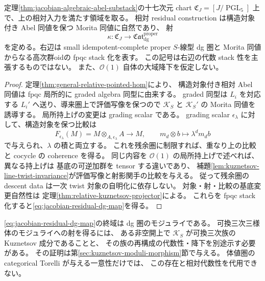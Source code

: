 \begin{theorem}
\label{thm:jacobian-residual-dg-map}
定理\ref{thm:jacobian-algebraic-abel-substack}の十七次元 chart
$\mathfrak C_J=[J/\operatorname{PGL}_5]$ 上で、上の相対入力を満たす領域を取る。
相対 residual construction は構造対象付き Abel 同値を保つ Morita 同値に自然であり、
射
\begin{equation}\label{eq:jacobian-residual-dg-map}
 \kappa:\mathfrak C_J\longrightarrow\mathfrak{Cat}^{\mathrm{proper}}_{\mathrm{dg}}
\end{equation}
を定める。右辺は small idempotent-complete proper $S$-線型 dg 圏と
Morita 同値からなる高次群oidの fpqc stack 化を表す。
この記号は右辺の代数 stack 性を主張するものではない。
また、$\mathcal O(1)$ 自体の大域降下を仮定しない。
\end{theorem}
\begin{proof}
定理\ref{thm:general-relative-pointed-hom}により、
構造対象付き相対 Abel 同値は fpqc 局所的に graded algebra 同型に由来する。
graded 同型は $L_i$ を対応する $L_i'$ へ送り、導来圏上で評価写像を保つので
$\mathcal K_S$ と $\mathcal K_S'$ の Morita 同値を誘導する。
局所持上げの変更は grading scalar である。
grading scalar $\epsilon_\lambda$ に対して、構造対象を保つ比較は
\[
 F_{\epsilon_\lambda}(M)
       =M\otimes_{A,\epsilon_\lambda}A\longrightarrow M,
 \qquad m_d\otimes b\longmapsto\lambda^d m_db
\]
で与えられ、$\lambda$ の積と両立する。
これを残余圏に制限すれば、重なり上の比較と cocycle の coherence を得る。
同じ内容を $\mathcal O(1)$ の局所持上げで述べれば、異なる持上げは
基底の可逆加群を tensor する違いであり、
補題\ref{lem:kuznetsov-line-twist-invariance}が評価写像と射影関手の比較を与える。
従って残余圏の descent data は一次 twist 対象の自明化に依存しない。
対象・射・比較の基底変更自然性は
定理\ref{thm:relative-kuznetsov-projector}による。
これらを fpqc stack 化すると\eqref{eq:jacobian-residual-dg-map}を得る。
\end{proof}

\begin{remark}[dg 圏への射と三次モジュライへの射]
\eqref{eq:jacobian-residual-dg-map}の終域は dg 圏のモジュライである。
可換三次三様体のモジュライへの射を得るには、
ある非空開上で $\mathcal K_S$ が可換三次族の Kuznetsov 成分であることと、
その族の再構成の代数性・降下を別途示す必要がある。
その証明は第\ref{sec:kuznetsov-moduli-morphism}節で与える。
体値圏の categorical Torelli が与える一意性だけでは、
この存在と相対代数性を代用できない。
\end{remark}

